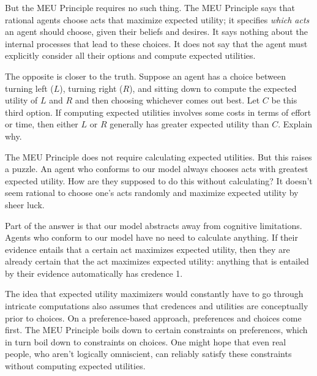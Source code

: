 But the MEU Principle requires no such thing. The MEU Principle says that
rational agents choose acts that maximize expected utility; it specifies
\emph{which acts} an agent should choose, given their beliefs and desires. It says
nothing about the internal processes that lead to these choices. It does not say
that the agent must explicitly consider all their options and compute expected
utilities.

\begin{exercise}{2}
  The opposite is closer to the truth. Suppose an agent has a choice between
  turning left ($L$), turning right ($R$), and sitting down to compute the
  expected utility of $L$ and $R$ and then choosing whichever comes out best.
  Let $C$ be this third option. If computing expected utilities involves some
  costs in terms of effort or time, then either $L$ or $R$ generally has greater
  expected utility than $C$. Explain why.
\end{exercise}

The MEU Principle does not require calculating expected utilities. But this
raises a puzzle. An agent who conforms to our model always chooses acts with
greatest expected utility. How are they supposed to do this without calculating?
It doesn't seem rational to choose one's acts randomly and maximize expected
utility by sheer luck.

Part of the answer is that our model abstracts away from cognitive limitations.
Agents who conform to our model have no need to calculate anything. If their
evidence entails that a certain act maximizes expected utility, then they are
already certain that the act maximizes expected utility: anything that is
entailed by their evidence automatically has credence 1.

The idea that expected utility maximizers would constantly have to go through
intricate computations also assumes that credences and utilities are
conceptually prior to choices. On a preference-based approach, preferences and
choices come first. The MEU Principle boils down to certain constraints on
preferences, which in turn boil down to constraints on choices. One might hope
that even real people, who aren't logically omniscient, can reliably satisfy
these constraints without computing expected utilities.


